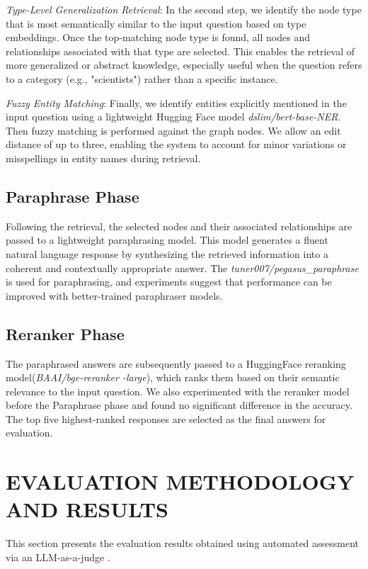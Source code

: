 \textit{Type-Level Generalization Retrieval}: In the second step, we identify the node type that is most semantically similar to the input question based on type embeddings. Once the top-matching node type is found, all nodes and relationships associated with that type are selected. This enables the retrieval of more generalized or abstract knowledge, especially useful when the question refers to a category (e.g., "scientists") rather than a specific instance.

\textit{Fuzzy Entity Matching}: Finally, we identify entities explicitly mentioned in the input question using a lightweight Hugging Face model \textit{dslim/bert-base-NER}. Then fuzzy matching is performed against the graph nodes. We allow an edit distance of up to three, enabling the system to account for minor variations or misspellings in entity names during retrieval.

\subsection{Paraphrase Phase}
Following the retrieval, the selected nodes and their associated relationships are passed to a lightweight paraphrasing model. This model generates a fluent natural language response by synthesizing the retrieved information into a coherent and contextually appropriate answer. The \textit{tuner007/pegasus\_paraphrase} is used for paraphrasing, and experiments suggest that performance can be improved with better-trained paraphraser models.

\subsection{Reranker Phase}
The paraphrased answers are subsequently passed to a HuggingFace reranking model(\textit{BAAI/bge-reranker -large}), which ranks them based on their semantic relevance to the input question. We also experimented with the reranker model before the Paraphrase phase and found no significant difference in the accuracy. The top five highest-ranked responses are selected as the final answers for evaluation.

\section{EVALUATION METHODOLOGY AND RESULTS}
This section presents the evaluation results obtained using automated assessment via an LLM-as-a-judge \cite{zheng2023judging}.

